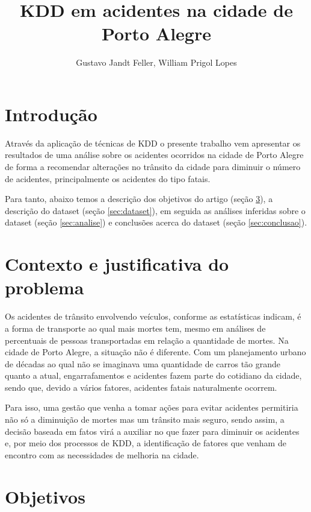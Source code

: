 \documentclass[11pt,article,oneside,a4paper]{abntex2}
\begin{document}
\title{KDD em acidentes na cidade de Porto Alegre}
\author{Gustavo Jandt Feller, William Prigol Lopes}
\maketitle

\section{Introdução}

Através da aplicação de técnicas de KDD o presente trabalho vem apresentar os resultados de uma análise sobre os acidentes ocorridos na cidade de Porto Alegre de forma a recomendar alterações no trânsito da cidade para diminuir o número de acidentes, principalmente os acidentes do tipo fatais. 

Para tanto, abaixo temos a descrição dos objetivos do artigo (seção \ref{sec:objetivos}), a descrição do dataset (seção \ref{sec:dataset}), em seguida as análises inferidas sobre o dataset (seção \ref{sec:analise}) e conclusões acerca do dataset (seção \ref{sec:conclusao}).

\section{Contexto e justificativa do problema}

Os acidentes de trânsito envolvendo veículos, conforme as estatísticas indicam, é a forma de transporte ao qual mais mortes tem, mesmo em análises de percentuais de pessoas transportadas em relação a quantidade de mortes. Na cidade de Porto Alegre, a situação não é diferente. Com um planejamento urbano de décadas ao qual não se imaginava uma quantidade de carros tão grande quanto a atual, engarrafamentos e acidentes fazem parte do cotidiano da cidade, sendo que, devido a vários fatores, acidentes fatais naturalmente ocorrem.

Para isso, uma gestão que venha a tomar ações para evitar acidentes permitiria não só a diminuição de mortes mas um trânsito mais seguro, sendo assim, a decisão baseada em fatos virá a auxiliar no que fazer para diminuir os acidentes e, por meio dos processos de KDD, a identificação de fatores que venham de encontro com as necessidades de melhoria na cidade.

\section{Objetivos}
\label{sec:objetivos}
\end{document}
